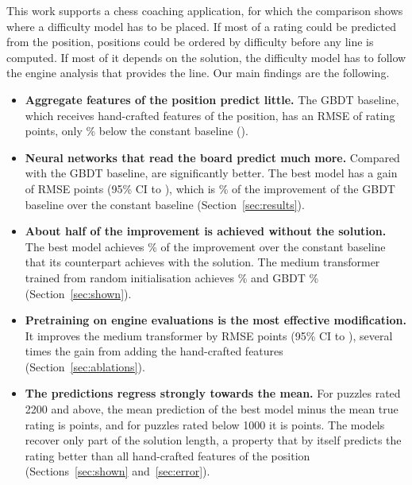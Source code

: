 \documentclass[11pt]{article}
\begin{document}
This work supports a chess coaching application, for which the comparison
shows where a difficulty model has to be placed. If most of a rating could be
predicted from the position, positions could be ordered by difficulty before
any line is computed. If most of it depends on the solution, the difficulty
model has to follow the engine analysis that provides the line. Our main
findings are the following.
\begin{itemize}
\item \textbf{Aggregate features of the position predict little.} The GBDT
baseline, which receives  hand-crafted features of the
position, has an RMSE of  rating points, only
\% below the constant baseline ().
\item \textbf{Neural networks that read the board predict much more.}
Compared with the GBDT baseline,  are significantly
better. The best model has a gain of  RMSE points (95\% CI
 to ), which is \% of
the improvement of the GBDT baseline over the constant baseline
(Section~\ref{sec:results}).
\ifshown
\item \textbf{About half of the improvement is achieved without the
solution.} The best model achieves \% of the
improvement over the constant baseline that its counterpart achieves with
the solution. The medium transformer trained from random initialisation
achieves \% and GBDT
\% (Section~\ref{sec:shown}).
\fi
\ifchangestart
\item \textbf{Pretraining on engine evaluations is the most effective
modification.} It improves the medium transformer by
 RMSE points
(95\% CI 
to ),
several times the gain from adding the hand-crafted features
(Section~\ref{sec:ablations}).
\fi
\iflook
\item \textbf{The predictions regress strongly towards the mean.} For puzzles
rated 2200 and above, the mean prediction of the best model minus the mean
true rating is  points, and for puzzles
rated below 1000 it is  points. The
models recover only part of the solution length, a property that by itself
predicts the rating better than all hand-crafted features of the position
(Sections~\ref{sec:shown} and~\ref{sec:error}).
\fi
\end{itemize}
\end{document}
